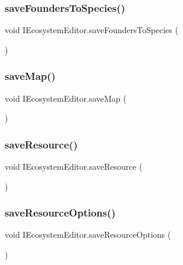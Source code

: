 \subsubsection{\texorpdfstring{save\+Founders\+To\+Species()}{saveFoundersToSpecies()}}
{\footnotesize\ttfamily void I\+Ecosystem\+Editor.\+save\+Founders\+To\+Species (\begin{DoxyParamCaption}{ }\end{DoxyParamCaption})}

\mbox{\label{interface_i_ecosystem_editor_a293320f7cb1ea2b228339f6a44e8fe8b}} 
\subsubsection{\texorpdfstring{save\+Map()}{saveMap()}}
{\footnotesize\ttfamily void I\+Ecosystem\+Editor.\+save\+Map (\begin{DoxyParamCaption}{ }\end{DoxyParamCaption})}

\mbox{\label{interface_i_ecosystem_editor_a04d432f43910eb38f45f68ff3a6a52a0}} 
\subsubsection{\texorpdfstring{save\+Resource()}{saveResource()}}
{\footnotesize\ttfamily void I\+Ecosystem\+Editor.\+save\+Resource (\begin{DoxyParamCaption}{ }\end{DoxyParamCaption})}

\mbox{\label{interface_i_ecosystem_editor_a673154ec9f666f6bf5b25c5767d5de46}} 
\subsubsection{\texorpdfstring{save\+Resource\+Options()}{saveResourceOptions()}}
{\footnotesize\ttfamily void I\+Ecosystem\+Editor.\+save\+Resource\+Options (\begin{DoxyParamCaption}{ }\end{DoxyParamCaption})}

